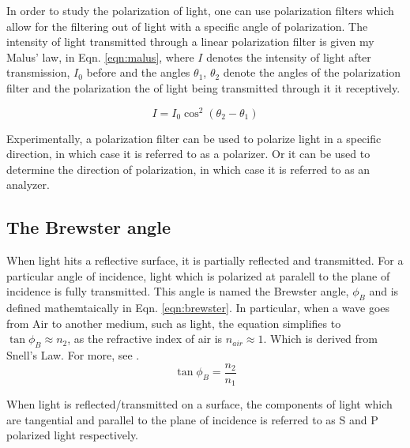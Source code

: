 \documentclass[%
 reprint,
 amsmath,amssymb,
 aps,
]{revtex4-1}
\begin{document}
    In order to study the polarization of light, one can use polarization filters which allow for the filtering out of light with a specific angle of polarization. The intensity of light transmitted through a linear polarization filter is given my Malus' law, in Eqn. \ref{eqn:malus}, where $I$ denotes the intensity of light after transmission, $I_0$ before and the angles $\theta_1$, $\theta_2$ denote the angles of the polarization filter and the polarization the of light being transmitted through it it receptively.

    \begin{equation}
        I = I_0 \cos^2(\theta_2 - \theta_1)
        \label{eqn:malus}
    \end{equation}

    Experimentally, a polarization filter can be used to polarize light in a specific direction, in which case it is referred to as a polarizer. Or it can be used to determine the direction of polarization, in which case it is referred to as an analyzer.


  \subsection{The Brewster angle}
    When light hits a reflective surface, it is partially reflected and transmitted. For a particular angle of incidence, light which is polarized at paralell to the plane of incidence is fully transmitted. This angle is named the Brewster angle, $\phi_B$ and is defined mathemtaically in Eqn. \ref{eqn:brewster}. In particular, when a wave goes from Air to another medium, such as light, the equation simplifies to $\tan \phi_B \approx n_2$, as the refractive index of air is $n_{air}\approx 1$. Which is derived from Snell's Law. For more, see \cite{bolger}.
    \begin{equation}
        \tan \phi_B = \frac{n_2}{n_1}
        \label{eqn:brewster}
    \end{equation}

    When light is reflected/transmitted on a surface, the components of light which are tangential and parallel to the plane of incidence is referred to as S and P polarized light respectively.
    
\end{document}
